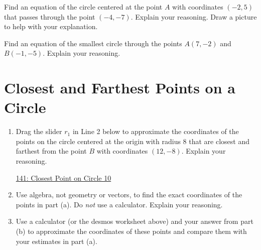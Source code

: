 \documentclass{ximera}
\begin{document}
\begin{question} \label{Q8F3f33r}
Find an equation of the circle centered at the point $A$ with coordinates $(-2,5)$ that passes through the point $(-4,-7)$. Explain your reasoning. Draw a picture to help with your explanation.
\end{question}


\begin{question}  \label{QKFDfer33}
Find an equation of the smallest circle through the points $A(7,-2)$ and $B(-1,-5)$. Explain your reasoning. 
\end{question}


\section{Closest and Farthest Points on a Circle}

\begin{question}  \label{QKfer4333}
\begin{enumerate}

\item Drag the slider $r_1$ in Line 2 below to approximate the coordinates of the points on the circle centered at the origin with radius $8$ that are closest and farthest from the point $B$ with coordinates $(12,-8)$. Explain your reasoning.

\begin{onlineOnly}
    \begin{center}
\end{center}
\end{onlineOnly}

\href{https://www.desmos.com/calculator/lnxyv7lwyr}{141: Closest Point on Circle 10}

\item Use algebra, not geometry or vectors, to find the exact coordinates of the points in part (a). Do \emph{not} use a calculator. Explain your reasoning.

\item Use a calculator (or the desmos worksheet above) and your answer from part (b) to approximate the coordinates of these points and compare them with your estimates in part (a).

\end{enumerate}
\end{question}
\end{document}

